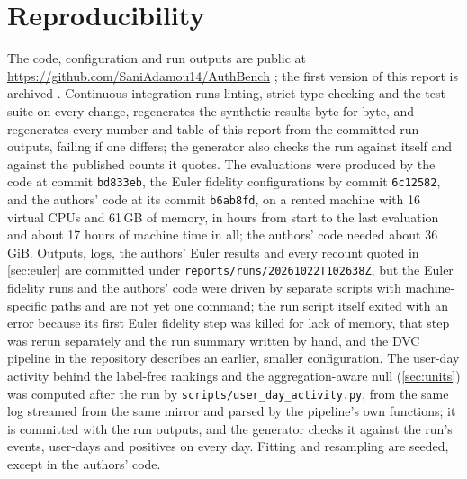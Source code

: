 \documentclass[11pt,a4paper]{article}
\begin{document}
\section{Reproducibility}
\label{sec:reproducibility}
The code, configuration and run outputs are public at \url{https://github.com/SaniAdamou14/AuthBench} \parencite{authbenchsoftware}; the first version of this report is archived \parencite{authbenchpreprint}. Continuous integration runs linting, strict type checking and the test suite on every change, regenerates the synthetic results byte for byte, and regenerates every number and table of this report from the committed run outputs, failing if one differs; the generator also checks the run against itself and against the published counts it quotes. The evaluations were produced by the code at commit \texttt{bd833eb}, the Euler fidelity configurations by commit \texttt{6c12582}, and the authors' code at its commit \texttt{b6ab8fd}, on a rented machine with 16 virtual CPUs and 61\,GB of memory, in \RunHours{} hours from start to the last evaluation and about 17 hours of machine time in all; the authors' code needed about 36\,GiB. Outputs, logs, the authors' Euler results and every recount quoted in \cref{sec:euler} are committed under \texttt{reports/runs/20261022T102638Z}, but the Euler fidelity runs and the authors' code were driven by separate scripts with machine-specific paths and are not yet one command; the run script itself exited with an error because its first Euler fidelity step was killed for lack of memory, that step was rerun separately and the run summary written by hand, and the DVC pipeline in the repository describes an earlier, smaller configuration. The user-day activity behind the label-free rankings and the aggregation-aware null (\cref{sec:units}) was computed after the run by \texttt{scripts/user\_day\_activity.py}, from the same log streamed from the same mirror and parsed by the pipeline's own functions; it is committed with the run outputs, and the generator checks it against the run's events, user-days and positives on every day. Fitting and resampling are seeded, except in the authors' code.
\end{document}
